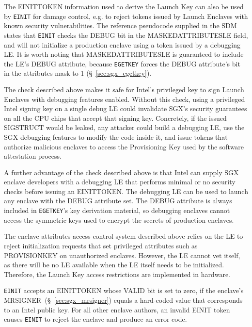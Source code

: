The EINITTOKEN information used to derive the Launch Key can also be used
by \texttt{EINIT} for damage control, e.g. to reject tokens issued by Launch
Enclaves with known security vulnerabilities. The reference pseudocode supplied
in the SDM states that \texttt{EINIT} checks the DEBUG bit in the
MASKEDATTRIBUTESLE field, and will not initialize a production enclave using
a token issued by a debugging LE. It is worth noting that MASKEDATTRIBUTESLE is
guaranteed to include the LE's DEBUG attribute, because \texttt{EGETKEY} forces
the DEBUG attribute's bit in the attributes mask to 1
(\S~\ref{sec:sgx_egetkey}).

The check described above makes it safe for Intel's privileged key to sign
Launch Enclaves with debugging features enabled. Without this check, using a
privileged Intel signing key on a single debug LE could invalidate SGX's
security guarantees on all the CPU chips that accept that signing key.
Concretely, if the issued SIGSTRUCT would be leaked, any attacker could build a
debugging LE, use the SGX debugging features to modify the code inside it, and
issue tokens that authorize malicious enclaves to access the Provisioning Key
used by the software attestation process.

A further advantage of the check described above is that Intel can supply SGX
enclave developers with a debugging LE that performs minimal or no security
checks before issuing an EINITTOKEN. The debugging LE can be used to launch any
enclave with the DEBUG attribute set. The DEBUG attribute is always included in
\texttt{EGETKEY}'s key derivation material, so debugging enclaves cannot access
the symmetric keys used to encrypt the secrets of production enclaves.


The enclave attributes access control system described above relies on the LE
to reject initialization requests that set privileged attributes such as
PROVISIONKEY on unauthorized enclaves. However, the LE cannot vet itself, as
there will be no LE available when the LE itself needs to be initialized.
Therefore, the Launch Key access restrictions are implemented in hardware.

\texttt{EINIT} accepts an EINITTOKEN whose VALID bit is set to zero, if
the enclave's MRSIGNER~(\S~\ref{sec:sgx_mrsigner}) equals a hard-coded value
that corresponds to an Intel public key. For all other enclave authors, an
invalid EINIT token causes \texttt{EINIT} to reject the enclave and produce an
error code.

